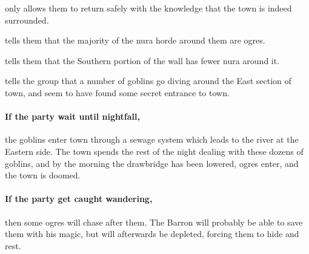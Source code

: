 \begin{multicols}{2}
\begin{list}{\addtocounter{list}{1}\textbf{Margin }:}{\raggedleft}
	\item{only allows them to return safely with the knowledge that the town is indeed surrounded.}
	\item{tells them that the majority of the nura horde around them are ogres.}
	\item{tells them that the Southern portion of the wall has fewer nura around it.}
	\item{tells the group that a number of goblins go diving around the East section of town, and seem to have found some secret entrance to town.}
\end{list}

\paragraph{If the party wait until nightfall,}
the goblins enter town through a sewage system which leads to the river at the Eastern side.
The town spends the rest of the night dealing with these dozens of goblins, and by the morning the drawbridge has been lowered, ogres enter, and the town is doomed.

\paragraph{If the party get caught wandering,}
then some ogres will chase after them.
The Barron will probably be able to save them with his magic, but will afterwards be depleted, forcing them to hide and rest.

\ogre

\end{multicols}
